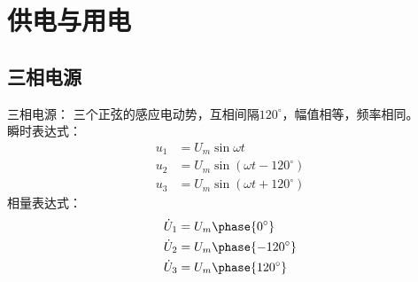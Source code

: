 \section{供电与用电}

\subsection{三相电源}

三相电源： 三个正弦的感应电动势，互相间隔$120^\circ$，幅值相等，频率相同。\\
瞬时表达式：
\begin{equation}
    \begin{aligned}
        u_{1} &= U_m \sin \omega t \\
        u_{2} &= U_m \sin (\omega t - 120^\circ) \\
        u_{3} &= U_m \sin (\omega t + 120^\circ)
    \end{aligned}
\end{equation}
\noindent 相量表达式：
\begin{equation}
    \begin{aligned}
        \dot{U}_{1} &= U_m \phase{ 0^\circ }\\
        \dot{U}_{2} &= U_m \phase{ -120^\circ} \\
        \dot{U}_{3} &= U_m \phase{ 120^\circ}
    \end{aligned}
\end{equation}

